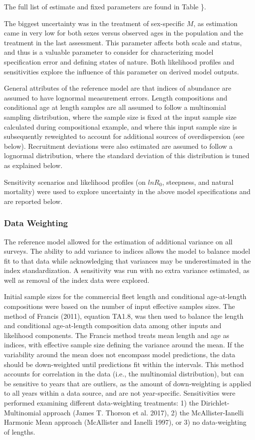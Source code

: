 \documentclass[
]{scrartcl}
\begin{document}
The full list of estimate and fixed parameters are found in Table \}.

The biggest uncertainty was in the treatment of sex-specific \(M\), as
estimation came in very low for both sexes versus observed ages in the
population and the treatment in the last assessment. This parameter
affects both scale and status, and thus is a valuable parameter to
consider for characterizing model specification error and defining
states of nature. Both likelihood profiles and sensitivities explore the
influence of this parameter on derived model outputs.

General attributes of the reference model are that indices of abundance
are assumed to have lognormal measurement errors. Length compositions
and conditional age at length samples are all assumed to follow a
multinomial sampling distribution, where the sample size is fixed at the
input sample size calculated during compositional example, and where
this input sample size is subsequently reweighted to account for
additional sources of overdispersion (see below). Recruitment deviations
were also estimated are assumed to follow a lognormal distribution,
where the standard deviation of this distribution is tuned as explained
below.

Sensitivity scenarios and likelihood profiles (on \(lnR_0\), steepness,
and natural mortality) were used to explore uncertainty in the above
model specifications and are reported below.

\subsubsection{Data Weighting}\label{data-weighting}

The reference model allowed for the estimation of additional variance on
all surveys. The ability to add variance to indices allows the model to
balance model fit to that data while acknowledging that variances may be
underestimated in the index standardization. A sensitivity was run with
no extra variance estimated, as well as removal of the index data were
explored.

Initial sample sizes for the commercial fleet length and conditional
age-at-length compositions were based on the number of input effective
samples sizes. The method of Francis (2011), equation TA1.8, was then
used to balance the length and conditional age-at-length composition
data among other inputs and likelihood components. The Francis method
treats mean length and age as indices, with effective sample size
defining the variance around the mean. If the variability around the
mean does not encompass model predictions, the data should be
down-weighted until predictions fit within the intervals. This method
accounts for correlation in the data (i.e., the multinomial
distribution), but can be sensitive to years that are outliers, as the
amount of down-weighting is applied to all years within a data source,
and are not year-specific. Sensitivities were performed examining
different data-weighting treatments: 1) the Dirichlet-Multinomial
approach (James T. Thorson et al. 2017), 2) the McAllister-Ianelli
Harmonic Mean approach (McAllister and Ianelli 1997), or 3) no
data-weighting of lengths.
\end{document}
